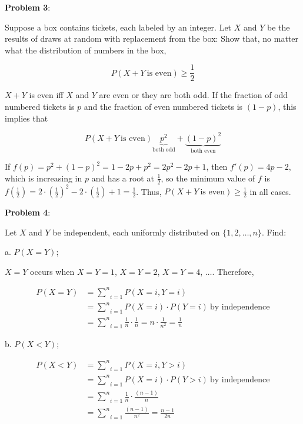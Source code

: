 \documentclass{article}
\begin{document}
\noindent\textbf{Problem 3}:

Suppose a box contains tickets, each labeled by an integer. Let $X$ and $Y$ be the results of draws at random with replacement from the box: Show that, no matter what the distribution of numbers in the box,

\[P(X+Y\ \text{is even})\ge\frac{1}{2}\]

{\color{blue}
$X+Y$ is even iff $X$ and $Y$ are even or they are both odd. If the fraction of odd numbered tickets is $p$ and the fraction of even numbered tickets is $(1-p)$, this implies that

\[P(X+Y\ \text{is even})\underbrace{p^2}_{\text{both odd}}+\underbrace{(1-p)^2}_{\text{both even}}\]

If $f(p)=p^2+(1-p)^2=1-2p+p^2=2p^2-2p+1$, then $f'(p)=4p-2$, which is increasing in $p$ and has a root at $\frac{1}{2}$, so the minimum value of $f$ is $f\left(\frac{1}{2}\right)=2\cdot\left(\frac{1}{2}\right)^2-2\cdot(\frac{1}{2})+1=\frac{1}{2}$. Thus, $P(X+Y\ \text{is even})\ge\frac{1}{2}$ in all cases.

}

\noindent\textbf{Problem 4}:

Let $X$ and $Y$ be independent, each uniformly distributed on $\{1,2,\ldots,n\}$. Find:

\indent\indent a. $P(X=Y)$;

{\color{blue}

$X=Y$ occurs when $X=Y=1$, $X=Y=2$, $X=Y=4$, $\ldots$. Therefore, 


\begin{align*}
P(X=Y)&=\underset{i=1}{\overset{n}{\sum}}P(X=i, Y=i)\\
&=\underset{i=1}{\overset{n}{\sum}}P(X=i)\cdot P(Y=i)\ \text{by independence}\\
&=\underset{i=1}{\overset{n}{\sum}}\frac{1}{n}\cdot\frac{1}{n}=n\cdot\frac{1}{n^2}=\frac{1}{n}
\end{align*}


}

\indent\indent b. $P(X<Y)$;

{\color{blue}


\begin{align*}
P(X<Y)&=\underset{i=1}{\overset{n}{\sum}}P(X=i,Y>i)\\
&=\underset{i=1}{\overset{n}{\sum}}P(X=i)\cdot P(Y>i)\ \text{by independence}\\
&=\underset{i=1}{\overset{n}{\sum}}\frac{1}{n}\cdot\frac{(n-1)}{n}\\
&=\underset{i=1}{\overset{n}{\sum}}\frac{(n-1)}{n^2}=\frac{n-1}{2n}
\end{align*}


}
\end{document}
